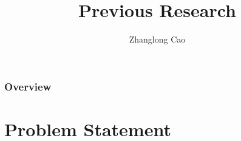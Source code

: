 \documentclass{beamer}
\title[]{Previous Research} %
\author{Zhanglong Cao} %
\institute[UO] %
{
Department of Maths \& Stats  \\
University of Otago %
}
\begin{document}
\begin{frame}
\titlepage %
\end{frame}

\begin{frame}
\frametitle{Overview} %
\tableofcontents %
\end{frame}


\section{Problem Statement} 
\end{document}
